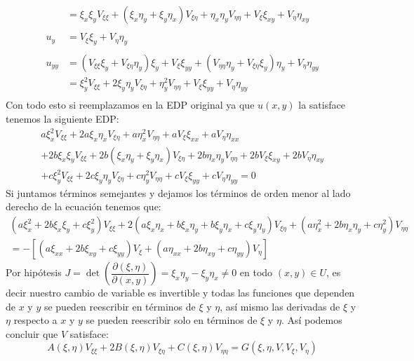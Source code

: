 \begin{homeworkProblem}
\begin{solucion}
\begin{align*}
            &=\xi_x\xi_yV_{\xi\xi}+(\xi_x\eta_y+\xi_y\eta_x)V_{\xi\eta}+\eta_x\eta_yV_{\eta\eta}+V_\xi\xi_{xy}+V_\eta\eta_{xy}\\
            \\
            u_y&=V_\xi\xi_y+V_\eta\eta_y\\
            \\
            u_{yy}&=(V_{\xi\xi}\xi_y+V_{\xi\eta}\eta_y)\xi_y+V_\xi\xi_{yy}+(V_{\eta\eta}\eta_y+V_{\xi\eta}\xi_y)\eta_y+V_\eta\eta_{yy}\\
            &=\xi^2_yV_{\xi\xi}+2\xi_y\eta_yV_{\xi\eta}+\eta^2_yV_{\eta\eta}+V_\xi\xi_{yy}+V_\eta\eta_{yy}\\
        \end{align*}
        Con todo esto si reemplazamos en la EDP original ya que $u(x,y)$ la satisface tenemos la siguiente EDP:
        \begin{multline*}
            a\xi^2_xV_{\xi\xi}+2a\xi_x\eta_xV_{\xi\eta}+a\eta^2_xV_{\eta\eta}+aV_\xi\xi_{xx}+aV_\eta\eta_{xx}\\
         +2b\xi_x\xi_yV_{\xi\xi}+2b(\xi_x\eta_y+\xi_y\eta_x)V_{\xi\eta}+2b\eta_x\eta_yV_{\eta\eta}+2bV_\xi\xi_{xy}+2bV_\eta\eta_{xy}\\
        +c\xi^2_yV_{\xi\xi}+2c\xi_y\eta_yV_{\xi\eta}+c\eta^2_yV_{\eta\eta}+cV_\xi\xi_{yy}+cV_\eta\eta_{yy}=0
        \end{multline*}
        Si juntamos términos semejantes y dejamos los términos de orden menor al lado derecho de la ecuación tenemos que:
        \begin{multline*}
            (a\xi_x^2+2b\xi_x\xi_y+c\xi_y^2)V_{\xi\xi}
            +2(a\xi_x\eta_x+b\xi_x\eta_y+b\xi_y\eta_x+c\xi_y\eta_y)V_{\xi\eta}
            +(a\eta_x^2+2b\eta_x\eta_y+c\eta_y^2)V_{\eta\eta}\\
            =-\left[(a\xi_{xx}+2b\xi_{xy}+c\xi_{yy})V_\xi+(a\eta_{xx}+2b\eta_{xy}+c\eta_{yy})V_\eta\right]
        \end{multline*}
        Por hipótesis $J=\det\left(\dfrac{\partial(\xi,\eta)}{\partial(x,y)}\right)=\xi_x\eta_y-\xi_y\eta_x\neq0$ en todo $(x,y)\in U$, es decir nuestro cambio de variable es invertible y todas las funciones que dependen de $x$ y $y$ se pueden reescribir en términos de $\xi$ y $\eta$, así mismo  las derivadas de $\xi$ y $\eta$ respecto a $x$ y $y$ se pueden reescribir solo en términos de $\xi$ y $\eta$. Así podemos concluir que $V$ satisface:
        $$A(\xi,\eta)V_{\xi\xi}+2B(\xi,\eta)V_{\xi\eta}+C(\xi,\eta)V_{\eta\eta}=G(\xi,\eta,V,V_\xi,V_\eta)$$


\end{solucion}
\end{homeworkProblem}
